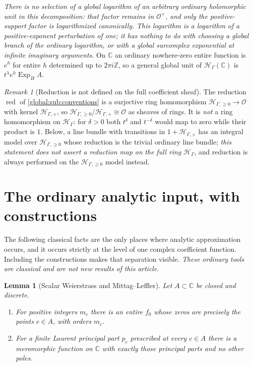 \documentclass[11pt,letterpaper]{article}
\newtheorem{lemma}[lemma]{Lemma}
\theoremstyle{definition}
\theoremstyle{remark}
\newtheorem{remark}[remark]{Remark}
\newcommand{\C}{\mathbb C}
\newcommand{\Z}{\mathbb Z}
\newcommand{\OO}{\mathcal O}
\newcommand{\HH}{\mathscr H_\Gamma}
\newcommand{\HP}{\mathscr H_{\Gamma,+}}
\newcommand{\HI}{\mathscr H_{\Gamma,\ge0}}
\newcommand{\red}{\operatorname{red}}
\newcommand{\ExpH}{\operatorname{Exp}_{H}}
\numberwithin{equation}{section}
\begin{document}
\emph{There is no selection of a global logarithm of an arbitrary ordinary holomorphic unit in this decomposition: that factor remains in $\OO^\times$, and only the positive-support factor is logarithmized canonically. This logarithm is a logarithm of a positive-exponent perturbation of one; it has nothing to do with choosing a global branch of the ordinary logarithm, or with a global surcomplex exponential at infinite imaginary arguments.} On $\C$ an ordinary nowhere-zero entire function is $e^h$ for entire $h$ determined up to $2\pi i\Z$, so a general global unit of $\HH(\C)$ is $t^\lambda e^h\ExpH A$.

\begin{remark}[Reduction is not defined on the full coefficient sheaf]\label{global:rem:reduction}
The reduction $\red$ of \cref{global:sub:conventions} is a surjective ring homomorphism $\HI\to\OO$ with kernel $\HP$, so $\HI/\HP\cong\OO$ as sheaves of rings. It is \emph{not} a ring homomorphism on $\HH$: for $\delta>0$ both $t^\delta$ and $t^{-\delta}$ would map to zero while their product is $1$. Below, a line bundle with transitions in $1+\HP$ has an integral model over $\HI$ whose reduction is the trivial ordinary line bundle; \emph{this statement does not assert a reduction map on the full ring $\HH$}, and reduction is always performed on the $\HI$ model instead.
\end{remark}

\section{The ordinary analytic input, with constructions}\label{global:sec:scalar}

The following classical facts are the only places where analytic approximation occurs, and it occurs strictly at the level of one complex coefficient function. Including the constructions makes that separation visible. \emph{These ordinary tools are classical and are not new results of this article.}

\begin{lemma}[Scalar Weierstrass and Mittag--Leffler]\label{global:lem:scalarML}
Let $A\subset\C$ be closed and discrete.
\begin{enumerate}
\item For positive integers $m_c$ there is an entire $f_0$ whose zeros are precisely the points $c\in A$, with orders $m_c$.
\item For a finite Laurent principal part $p_c$ prescribed at every $c\in A$ there is a meromorphic function on $\C$ with exactly those principal parts and no other poles.
\end{enumerate}
\end{lemma}
\end{document}
